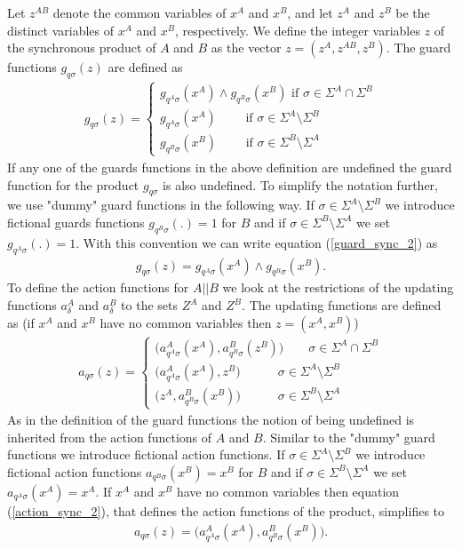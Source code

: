 \documentclass{article}
\begin{document}
 Let $z^{AB}$ denote the common variables of $x^{A}$ and $x^{B}$, and let $z^A$
and $z^B$ be the distinct variables of $x^{A}$ and $x^{B}$,
respectively. We define the integer variables $z$ of the
synchronous product of $A$ and $B$ as the vector $z=(z^A, z^{AB},
z^B)$. The guard functions $g_{q \sigma}(z)$ are defined as
\begin{eqnarray}\label{guard_sync_2}
g_{q \sigma}(z)=\left\{
\begin{array}{ll}
g_{q^A\sigma}(x^{A})\wedge g_{q^B\sigma}(x^{B}) \textrm{ if }\sigma\in \Sigma^A \cap \Sigma^B\\
g_{q^A\sigma}(x^{A}) \quad\quad \textrm{ if } \sigma\in \Sigma^A \setminus \Sigma^B\\
g_{q^B\sigma}(x^{B}) \quad\quad \textrm{ if }
\sigma\in\Sigma^B\setminus \Sigma^A
\end{array}\right.
\end{eqnarray}
If any one of the guards functions in the above definition are
undefined the guard function for the product $g_{q \sigma}$ is
also undefined. To simplify the notation further, we use "dummy"
guard functions in the following way. If $\sigma\in \Sigma^A
\setminus \Sigma^B$ we introduce fictional guards functions
$g_{q^B\sigma}(.)=1$ for $B$ and if $\sigma\in\Sigma^B\setminus
\Sigma^A$ we set $g_{q^A\sigma}(.)=1$. With this convention we can
write equation (\ref{guard_sync_2}) as
\begin{eqnarray}
g_{q \sigma}(z)= g_{q^A\sigma}(x^{A})\wedge g_{q^B\sigma}(x^{B}).
\end{eqnarray}
To define the action functions for $A||B$ we look at the
restrictions of the updating functions $a^A_\delta$ and
$a^B_\delta$ to the sets $Z^A$ and $Z^B$. The updating functions
are defined as (if $x^{A}$ and $x^{B}$ have no common variables
then $z=(x^{A},x^{B})$)
\begin{eqnarray}\label{action_sync_2}
a_{q \sigma}(z)=\left\{
\begin{array}{ll}
 \big(a^A_{q^A \sigma}(x^{A}), a^B_{q^B \sigma}(z^{B})\big)\quad\quad\sigma\in \Sigma^A \cap \Sigma^B\\
\big(a^A_{q^A \sigma}(x^{A}), z^{B}\big)\quad\quad\quad\sigma\in \Sigma^A \setminus \Sigma^B\\
\big(z^{A}, a^B_{q^B \sigma}(x^{B})\big)\quad\quad\quad\sigma\in
\Sigma^B \setminus \Sigma^A
\end{array}\right.
\end{eqnarray}
As in the definition of the guard functions the notion of being
undefined is inherited from the action functions of $A$ and $B$.
Similar to the "dummy" guard functions we introduce fictional
action functions. If $\sigma\in \Sigma^A \setminus \Sigma^B$ we
introduce fictional action functions $a_{q^B\sigma}(x^B)=x^B$ for
$B$ and if $\sigma\in\Sigma^B\setminus \Sigma^A$ we set
$a_{q^A\sigma}(x^A)=x^A$. If $x^{A}$ and $x^{B}$ have no common
variables then equation (\ref{action_sync_2}), that defines the
action functions of the product, simplifies to
\begin{eqnarray}
a_{q \sigma}(z)=
 \big(a^A_{q^A \sigma}(x^{A}), a^B_{q^B \sigma}(x^{B})\big).
\end{eqnarray}
\end{document}
